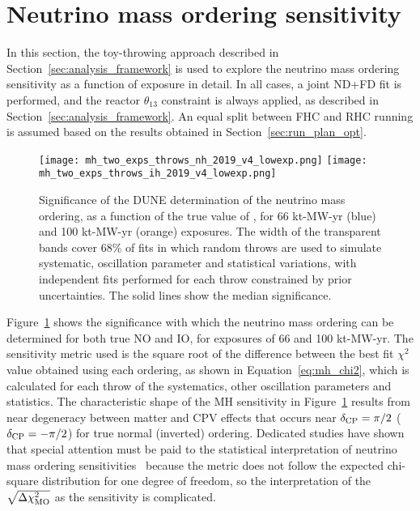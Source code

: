 \section{Neutrino mass ordering sensitivity}
\label{sec:mh_sens}

In this section, the toy-throwing approach described in Section~\ref{sec:analysis_framework} is used to explore the neutrino mass ordering sensitivity as a function of exposure in detail. In all cases, a joint ND+FD fit is performed, and the reactor $\theta_{13}$ constraint is always applied, as described in Section~\ref{sec:analysis_framework}. An equal split between FHC and RHC running is assumed based on the results obtained in Section~\ref{sec:run_plan_opt}.

\begin{figure}[htbp]
  \centering
  \texttt{[image: mh\_two\_exps\_throws\_nh\_2019\_v4\_lowexp.png]}
  \texttt{[image: mh\_two\_exps\_throws\_ih\_2019\_v4\_lowexp.png]}
  \caption{Significance of the DUNE determination of the neutrino mass ordering, as a function of the true value of \deltacp, for 66 kt-MW-yr (blue) and 100 kt-MW-yr (orange) exposures. The width of the transparent bands cover 68\% of fits in which random throws are used to simulate systematic, oscillation parameter and statistical variations, with independent fits performed for each throw constrained by prior uncertainties. The solid lines show the median significance.}
  \label{fig:mh_bands}
\end{figure}
Figure~\ref{fig:mh_bands} shows the significance with which the neutrino mass ordering can be determined for both true NO and IO, for exposures of 66 and 100 kt-MW-yr. The sensitivity metric used is the square root of the difference between the best fit $\chi^{2}$ value obtained using each ordering, as shown in Equation~\ref{eq:mh_chi2}, which is calculated for each throw of the systematics, other oscillation parameters and statistics. The characteristic shape of the MH sensitivity in Figure~\ref{fig:mh_bands} results from near degeneracy between matter and CPV effects that occurs near $\delta_{\rm CP}=\pi/2$ ($\delta_{\rm CP}=-\pi/2$) for true normal (inverted) ordering. Dedicated studies have shown that special attention must be paid to the statistical interpretation of neutrino mass ordering sensitivities~\cite{Ciuffoli:2013rza,Qian:2012zn,Blennow:2013oma} because the \dchisqMO metric does not follow the expected chi-square distribution for one degree of freedom, so the interpretation of the $\sqrt{\Delta\chi^{2}_{\mathrm{MO}}}$ as the sensitivity is complicated.

